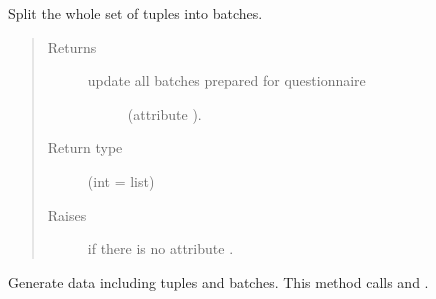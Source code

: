 \documentclass[a4paper,12pt,english]{sphinxmanual}
\begin{document}
\begin{fulllineitems}
\begin{fulllineitems}
\label{\detokenize{project_rst/generator:project.generator.DataGenerator.generate_batches}}
Split the whole set of tuples into batches.
\begin{quote}\begin{description}
\item[{Returns}] \leavevmode
\begin{description}
\item[{update all batches prepared for questionnaire}] \leavevmode
(attribute {\hyperref[\detokenize{project_rst/generator:project.generator.DataGenerator.batches}]{}}).

\end{description}


\item[{Return type}] \leavevmode
{}(int = list)

\item[{Raises}] \leavevmode
{} \textendash{} if there is no attribute {\hyperref[\detokenize{project_rst/generator:project.generator.DataGenerator.tuples}]{}}.

\end{description}\end{quote}

\end{fulllineitems}


\begin{fulllineitems}
\label{\detokenize{project_rst/generator:project.generator.DataGenerator.generate_data}}
Generate data including tuples and batches. This method calls
{\hyperref[\detokenize{project_rst/generator:project.generator.DataGenerator.generate_tuples}]{}} and {\hyperref[\detokenize{project_rst/generator:project.generator.DataGenerator.generate_batches}]{}}.


\end{fulllineitems}
\end{fulllineitems}
\end{document}
